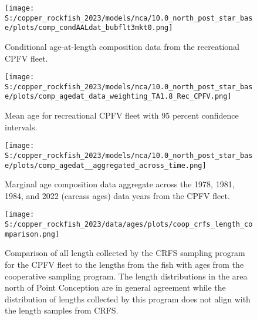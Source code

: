 \documentclass[11pt,
  letterpaper,
]{article}
\begin{document}
\begin{figure}
{\centering
\texttt{[image: S:/copper\_rockfish\_2023/models/nca/10.0\_north\_post\_star\_base/plots/comp\_condAALdat\_bubflt3mkt0.png]}
}
\caption{Conditional age-at-length composition data from the recreational CPFV fleet.\label{fig:rec-cpfv-caal-data}}
\end{figure}

\pagebreak

\begin{figure}
{\centering
\texttt{[image: S:/copper\_rockfish\_2023/models/nca/10.0\_north\_post\_star\_base/plots/comp\_agedat\_data\_weighting\_TA1.8\_Rec\_CPFV.png]}
}
\caption{Mean age for recreational CPFV fleet with 95 percent confidence intervals.\label{fig:mean-rec-cpfv-age-data}}
\end{figure}

\FloatBarrier

\begin{figure}
{\centering
\texttt{[image: S:/copper\_rockfish\_2023/models/nca/10.0\_north\_post\_star\_base/plots/comp\_agedat\_\_aggregated\_across\_time.png]}
}
\caption{Marginal age composition data aggregate across the 1978, 1981, 1984, and 2022 (carcass ages) data years from the CPFV fleet.\label{fig:rec-cpfv-marg-age-data}}
\end{figure}

\pagebreak

\begin{figure}
{\centering
\texttt{[image: S:/copper\_rockfish\_2023/data/ages/plots/coop\_crfs\_length\_comparison.png]}
}
\caption{Comparison of all length collected by the CRFS sampling program for the CPFV fleet to the lengths from the fish with ages from the cooperative sampling program. The length distributions in the area north of Point Conception are in general agreement while the distribution of lengths collected by this program does not align with the length samples from CRFS.\label{fig:coop-len-comparison}}
\end{figure}
\end{document}
